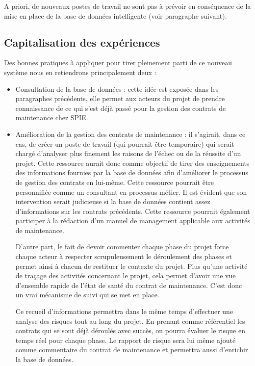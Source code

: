 A priori, de nouveaux postes de travail ne sont pas à prévoir en conséquence de la mise en place de la \og base de données intelligente \fg (voir paragraphe suivant).

\subsection{Capitalisation des expériences}

Des bonnes pratiques à appliquer pour tirer pleinement parti de ce nouveau système nous en retiendrons principalement deux :

\begin{itemize}
\item Consultation de la base de données : cette idée est exposée dans les paragraphes précédents, elle permet aux acteurs du projet de prendre connaissance de ce qui s'est déjà passé pour la gestion des contrats de maintenance chez SPIE.
\item Amélioration de la gestion des contrats de maintenance : il s'agirait, dans ce cas, de créer un poste de travail (qui pourrait être temporaire) qui serait chargé d'analyser plus finement les raisons de l'échec ou de la réussite d'un projet. Cette ressource aurait donc comme objectif de tirer des enseignements des informations fournies par la base de données afin d'améliorer le processus de gestion des contrats en lui-même. Cette ressource pourrait être personnifiée comme un consultant en processus métier. Il est évident que son intervention serait judicieuse si la base de données contient assez d'informations sur les contrats précédents. Cette ressource pourrait également participer à la rédaction d'un manuel de management applicable aux activités de maintenance.

\medskip

D'autre part, le fait de devoir commenter chaque phase du projet force chaque acteur à respecter scrupuleusement le déroulement des phases et permet ainsi à chacun de restituer le contexte du projet. Plus qu'une activité de traçage des activités concernant le projet, cela permet d'avoir une vue d'ensemble rapide de l'état de santé du contrat de maintenance. C'est donc un vrai mécanisme de suivi qui se met en place.

Ce recueil d'informations permettra dans le même temps d'effectuer une analyse des risques tout au long du projet. En prenant comme référentiel les contrats qui se sont déjà déroulés avec succès, on pourra évaluer le risque en temps réel pour chaque phase. Le rapport de risque sera lui même ajouté comme \og commentaire \fg du contrat de maintenance et permettra aussi d'enrichir la base de données.


\end{itemize}
